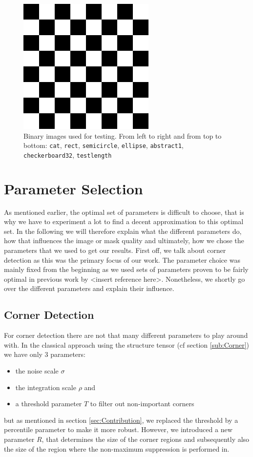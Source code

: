 \begin{figure}[ht]
    \includegraphics[width=0.32\linewidth]{../../images/binary/checkerboard32.png}
    \caption{Binary images used for testing. From left to right and from top to bottom:
        \texttt{cat}, \texttt{rect},
    \texttt{semicircle}, \texttt{ellipse}, \texttt{abstract1}, \texttt{checkerboard32},
\texttt{testlength}}\label{fig:BinaryImg}
\end{figure}

\section{Parameter Selection}\label{sec:Parameters}
As mentioned earlier, the optimal set of parameters is difficult to choose, that is why we have to
experiment a lot to find a decent approximation to this optimal set. In the following we will
therefore explain what the different parameters do, how that influences the image or mask quality
and ultimately, how we chose the parameters that we used to get our results.
First off, we talk about corner detection as this was the primary focus of our work. The parameter
choice was mainly fixed from the beginning as we used sets of parameters proven to be fairly
optimal in previous work by {<insert reference here>}. Nonetheless, we shortly go over the different
parameters and explain their influence.
\subsection{Corner Detection}
For corner detection there are not that many different parameters to play around with. In the
classical approach using the structure tensor (cf section \ref{sub:Corner}) we have only 3
parameters:
\begin{itemize}
    \item the noise scale $\sigma$
    \item the integration scale $\rho$ and
    \item a threshold parameter $T$ to filter out non-important corners
\end{itemize}
but as mentioned in section \ref{sec:Contribution}, we replaced the threshold by a percentile
parameter to make it more robust.
However, we introduced a new parameter $R$, that determines the size of the corner regions and
subsequently also the size of the region where the non-maximum suppression is performed in.

